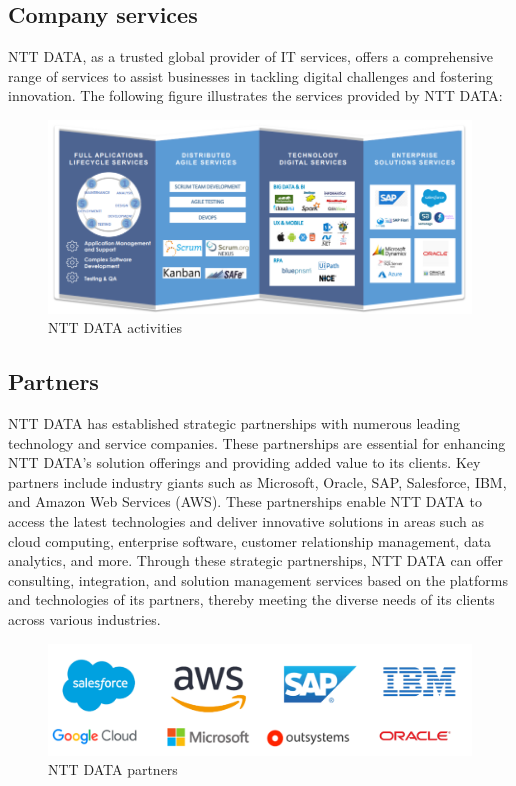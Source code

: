 \documentclass[12pt,a4paper,table,english]{article}
\begin{document}
	\pagebreak
	
	\subsection{Company services}
	
	NTT DATA, as a trusted global provider of IT services, offers a comprehensive range of services to assist businesses in tackling digital challenges and fostering innovation. The following figure illustrates the services provided by NTT DATA:
	\begin{figure}[h!]
		\centering
		\includegraphics[width=0.8\linewidth]{Image/nttactivities.png}
		\caption{NTT DATA activities}
		\label{fig:NTT DATA activities}
	\end{figure}
	
	\subsection{Partners}
	
	NTT DATA has established strategic partnerships with numerous leading technology and service companies. These partnerships are essential for enhancing NTT DATA's solution offerings and providing added value to its clients. Key partners include industry giants such as Microsoft, Oracle, SAP, Salesforce, IBM, and Amazon Web Services (AWS). These partnerships enable NTT DATA to access the latest technologies and deliver innovative solutions in areas such as cloud computing, enterprise software, customer relationship management, data analytics, and more. Through these strategic partnerships, NTT DATA can offer consulting, integration, and solution management services based on the platforms and technologies of its partners, thereby meeting the diverse needs of its clients across various industries.
	
	
	\begin{figure}[h!]
		\centering
		\includegraphics[width=0.8\linewidth]{Image/nttpartners.png}
		\caption{NTT DATA partners}
		\label{fig:NTT DATA partners}
	\end{figure}
	
\end{document}
